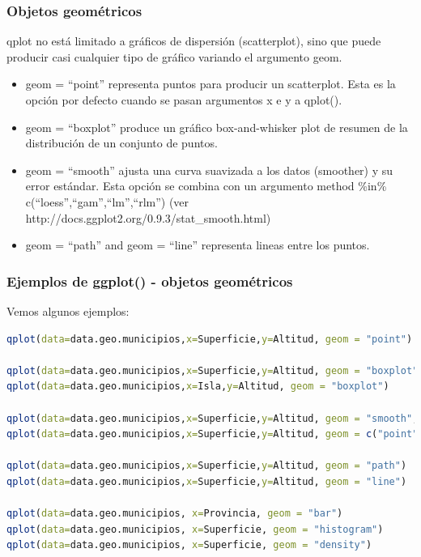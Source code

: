 \documentclass[8pt,ignorenonframetext,]{beamer}
\begin{document}
\begin{frame}\frametitle{Objetos geométricos}

qplot no está limitado a gráficos de dispersión (scatterplot), sino que
puede producir casi cualquier tipo de gráfico variando el argumento
geom.

\begin{itemize}
\itemsep1pt\parskip0pt
\item
  geom = ``point'' representa puntos para producir un scatterplot. Esta
  es la opción por defecto cuando se pasan argumentos x e y a qplot().
\item
  geom = ``boxplot'' produce un gráfico box-and-whisker plot de resumen
  de la distribución de un conjunto de puntos.
\item
  geom = ``smooth'' ajusta una curva suavizada a los datos (smoother) y
  su error estándar. Esta opción se combina con un argumento method
  \%in\% c(``loess'',``gam'',``lm'',``rlm'') (ver
  http://docs.ggplot2.org/0.9.3/stat\_smooth.html)
\item
  geom = ``path'' and geom = ``line'' representa lineas entre los
  puntos.
\end{itemize}

\end{frame}

\begin{frame}[fragile]\frametitle{Ejemplos de ggplot() - objetos
geométricos}

Vemos algunos ejemplos:

\begin{lstlisting}[language=R]
qplot(data=data.geo.municipios,x=Superficie,y=Altitud, geom = "point")

qplot(data=data.geo.municipios,x=Superficie,y=Altitud, geom = "boxplot", colour = Isla)    # cuidado con el tipo de variables
qplot(data=data.geo.municipios,x=Isla,y=Altitud, geom = "boxplot")

qplot(data=data.geo.municipios,x=Superficie,y=Altitud, geom = "smooth", method="loess")
qplot(data=data.geo.municipios,x=Superficie,y=Altitud, geom = c("point", "smooth"), method="lm")

qplot(data=data.geo.municipios,x=Superficie,y=Altitud, geom = "path")
qplot(data=data.geo.municipios,x=Superficie,y=Altitud, geom = "line")

qplot(data=data.geo.municipios, x=Provincia, geom = "bar")
qplot(data=data.geo.municipios, x=Superficie, geom = "histogram")
qplot(data=data.geo.municipios, x=Superficie, geom = "density")
\end{lstlisting}

\end{frame}
\end{document}
